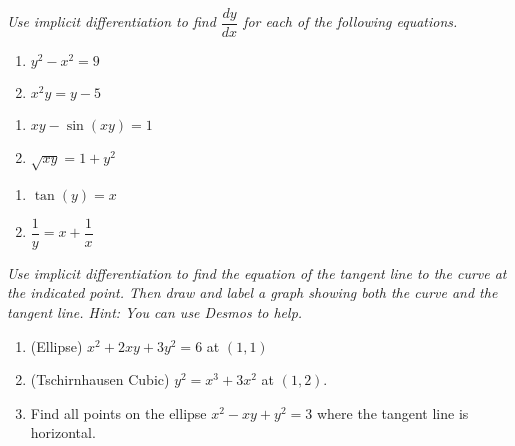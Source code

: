 \documentclass[11pt]{article}
\begin{document}
\noindent
\textit{Use implicit differentiation to find $\dfrac{dy}{dx}$ for each of the following equations.}
\noindent
\begin{multicols}{2}
\begin{enumerate}
\setcounter{enumi}{\theenumCount}
\item $y^2 - x^2 = 9$
\item $x^2 y = y - 5$
\setcounter{enumCount}{\theenumi}
\end{enumerate}
\end{multicols}
\vfill

\noindent
\begin{multicols}{2}
\begin{enumerate}
\setcounter{enumi}{\theenumCount}
\item $x y - \sin(xy) = 1$
\item $\sqrt{xy} = 1 + y^2$
\setcounter{enumCount}{\theenumi}
\end{enumerate}
\end{multicols}
\vfill

\newpage
\noindent
\begin{multicols}{2}
\begin{enumerate}
\setcounter{enumi}{\theenumCount}
\item $\tan(y) = x$
\item $\dfrac{1}{y} = x + \dfrac{1}{x}$
\setcounter{enumCount}{\theenumi}
\end{enumerate}
\end{multicols}
\vfill


\noindent
\textit{Use implicit differentiation to find the equation of the tangent line to the curve at the indicated point.  Then draw and label a graph showing both the curve and the tangent line.  Hint: You can use Desmos to help.}
\begin{enumerate}
\setcounter{enumi}{\theenumCount}
\item (Ellipse) $x^2 + 2xy + 3y^2 = 6$ at $(1,1)$    
\vfill

\item (Tschirnhausen Cubic) $y^2 = x^3 + 3x^2$ at $(1,2)$.
\vfill

\item Find all points on the ellipse $x^2 - xy + y^2 = 3$ where the tangent line is horizontal. 
\vfill
\setcounter{enumCount}{\theenumi}
\end{enumerate}
\end{document}
